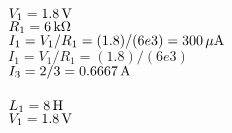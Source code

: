 

\mbox{$V_{1}=\mbox{$1.8 \,\mathrm{ V}$}$}\\
\mbox{$R_{1}=\mbox{$6 \,\mathrm{k \Omega}$}$}\\
\mbox{$I_{1} = V_{1}/R_{1}  =  (1.8)/(6e3) = \mbox{$300 \,\mathrm{\mu A}$}$}\\
\mbox{$I_{1} = V_{1}/R_{1}  =  (1.8)/(6e3)$}\\
\mbox{$I_{3}=2/3  = \mbox{$0.6667 \,\mathrm{ A}$}$}\\\\
\mbox{$L_{1}=\mbox{$8 \,\mathrm{ H}$}$}\\
\mbox{$V_{1}=\mbox{$1.8 \,\mathrm{ V}$}$}\\

